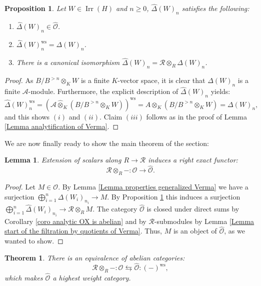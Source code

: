 \documentclass{amsart}
\newtheorem{teo}[defi]{ Theorem}
\newtheorem{prop}[defi]{ Proposition}
\newtheorem{Lemma}[defi]{Lemma}
\newcommand{\OX}{\mathcal{O}}
\begin{document}
\begin{prop}\label{prop basic properties generalized analytic Verma}
Let $W\in \operatorname{Irr}(H)$ and $n\geq 0$, $\widehat{\Delta}(W)_n$ satisfies the following:
\begin{enumerate}[label=(\roman*)]
    \item $\widehat{\Delta}(W)_n\in \widehat{\OX}$.
    \item $\widehat{\Delta}(W)^{\operatorname{ws}}_n=\Delta(W)_n$.
    \item There is a canonical isomorphism $\widehat{\Delta}(W)_n=\mathscr{R}\otimes_R\Delta(W)_n$.
\end{enumerate}
\end{prop}
\begin{proof}
As $B/B^{>n}\otimes_KW$ is a finite $K$-vector space, it is clear that $\widehat{\Delta}(W)_n$  is a finite $\mathscr{A}$-module. Furthermore, the explicit description of $\widehat{\Delta}(W)_n$ yields:
\begin{equation*}
    \widehat{\Delta}(W)^{\operatorname{ws}}_n=(\mathscr{A}\widehat{\otimes}_K(B/B^{>n}\otimes_KW))^{\operatorname{ws}}=A\otimes_K(B/B^{>n}\otimes_KW)=\Delta(W)_n,
\end{equation*}
and this shows $(i)$ and $(ii)$. Claim $(iii)$ follows as in the proof of Lemma \ref{Lemma analytification of Verma}.
\end{proof}
We are now finally ready to show the main theorem of the section:
\begin{Lemma}
 Extension of scalars along $R\rightarrow \mathscr{R}$ induces a right exact functor:
 \begin{equation*}
     \mathscr{R}\otimes_R-:\OX\rightarrow \widehat{\OX}.
 \end{equation*}
\end{Lemma}
\begin{proof}
Let $M\in \OX$. By Lemma \ref{Lemma properties generalized Verma} we have a surjection $\bigoplus_{i=1}^n\Delta(W_i)_{n_i}\rightarrow M$. By Proposition \ref{prop basic properties generalized analytic Verma} this induces a surjection $\bigoplus_{i=1}^n\widehat{\Delta}(W_i)_{n_i}\rightarrow \mathscr{R}\otimes_RM$. The category $\widehat{\OX}$ is closed under direct sums by Corollary \ref{coro analytic OX is abelian} and by $\mathscr{R}$-submodules by Lemma \ref{Lemma start of the filtration by quotients of Verma}. Thus, $M$ is an object of $\widehat{\OX}$, as we wanted to show.
\end{proof}
\begin{teo}\label{teo category O for p-adic banach algebras with a triangular decomposition}
There is an equivalence of abelian categories:
\begin{equation*}
 \mathscr{R}\otimes_{R}-:     \OX\leftrightarrows \widehat{\OX}:(-)^{\operatorname{ws}},
\end{equation*}
which makes $\widehat{\OX}$ a highest weight category.
\end{teo}
\end{document}

